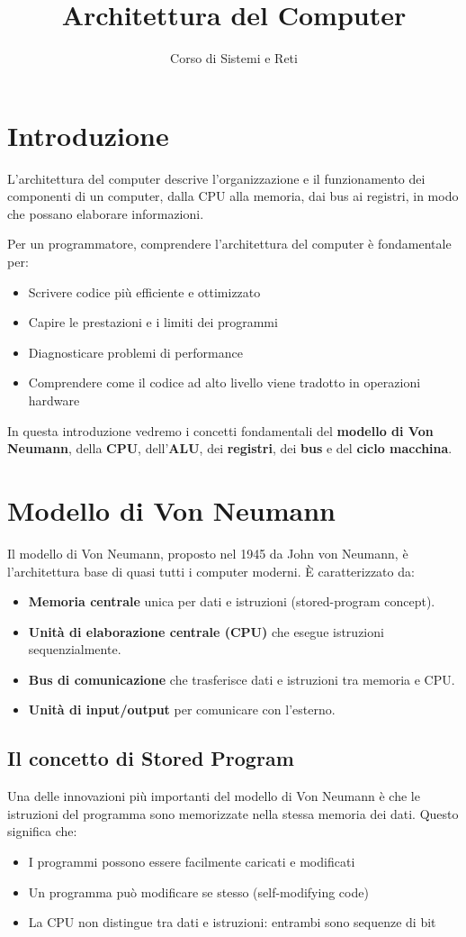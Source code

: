 \documentclass[12pt,a4paper]{article}
\title{Architettura del Computer}
\author{Corso di Sistemi e Reti}
\begin{document}
\maketitle

\section{Introduzione}
L'architettura del computer descrive l'organizzazione e il funzionamento dei componenti di un computer, dalla CPU alla memoria, dai bus ai registri, in modo che possano elaborare informazioni. 

Per un programmatore, comprendere l'architettura del computer è fondamentale per:
\begin{itemize}
    \item Scrivere codice più efficiente e ottimizzato
    \item Capire le prestazioni e i limiti dei programmi
    \item Diagnosticare problemi di performance
    \item Comprendere come il codice ad alto livello viene tradotto in operazioni hardware
\end{itemize}

In questa introduzione vedremo i concetti fondamentali del \textbf{modello di Von Neumann}, della \textbf{CPU}, dell'\textbf{ALU}, dei \textbf{registri}, dei \textbf{bus} e del \textbf{ciclo macchina}.

\section{Modello di Von Neumann}
Il modello di Von Neumann, proposto nel 1945 da John von Neumann, è l'architettura base di quasi tutti i computer moderni. È caratterizzato da:
\begin{itemize}
    \item \textbf{Memoria centrale} unica per dati e istruzioni (stored-program concept).
    \item \textbf{Unità di elaborazione centrale (CPU)} che esegue istruzioni sequenzialmente.
    \item \textbf{Bus di comunicazione} che trasferisce dati e istruzioni tra memoria e CPU.
    \item \textbf{Unità di input/output} per comunicare con l'esterno.
\end{itemize}

\subsection{Il concetto di Stored Program}
Una delle innovazioni più importanti del modello di Von Neumann è che le istruzioni del programma sono memorizzate nella stessa memoria dei dati. Questo significa che:
\begin{itemize}
    \item I programmi possono essere facilmente caricati e modificati
    \item Un programma può modificare se stesso (self-modifying code)
    \item La CPU non distingue tra dati e istruzioni: entrambi sono sequenze di bit
\end{itemize}
\end{document}
